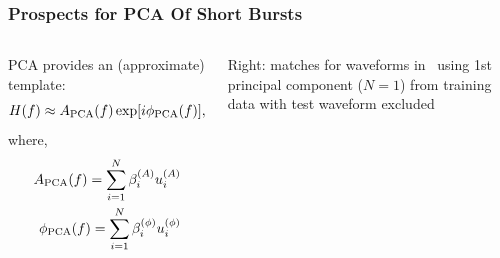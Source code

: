 \documentclass[serif,mathserif,10pt]{beamer}
\let\oldframetitle\frametitle%
\renewcommand{\frametitle}[1]{%
      \oldframetitle{#1}\setstretch{1.2}}
\begin{document}
\begin{frame}
    \frametitle{Prospects for PCA Of Short Bursts}

    \begin{columns}[]




        PCA provides an (approximate) template:
        \begin{equation}
            H(f) \approx A_{\rm PCA}(f) \exp [i \phi_{\rm PCA}(f)],\nonumber
        \end{equation}
        where,
        \begin{eqnarray}
            A_{\rm PCA}(f) = \sum_{i=1}^N \beta_i^{(A)}u_i^{(A)} \\ \nonumber
            \phi_{\rm PCA}(f) = \sum_{i=1}^N \beta_i^{(\phi)}u_i^{(\phi)} \nonumber
        \end{eqnarray}

        Right: matches for waveforms in~\cite{2014PhRvD..90f2004C} using 1st
        principal component ($N=1$) from training data with test waveform
        excluded



\end{columns}
\end{frame}
\end{document}
